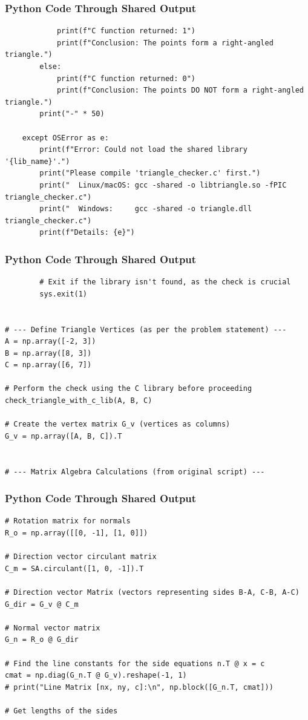 \documentclass{beamer}
\begin{document}
\begin{frame}[fragile]
\frametitle{Python Code Through Shared Output}
\begin{lstlisting}
            print(f"C function returned: 1")
            print(f"Conclusion: The points form a right-angled triangle.")
        else:
            print(f"C function returned: 0")
            print(f"Conclusion: The points DO NOT form a right-angled triangle.")
        print("-" * 50)

    except OSError as e:
        print(f"Error: Could not load the shared library '{lib_name}'.")
        print("Please compile 'triangle_checker.c' first.")
        print("  Linux/macOS: gcc -shared -o libtriangle.so -fPIC triangle_checker.c")
        print("  Windows:     gcc -shared -o triangle.dll triangle_checker.c")
        print(f"Details: {e}")
        \end{lstlisting}
\end{frame}  

\begin{frame}[fragile]
\frametitle{Python Code Through Shared Output}
\begin{lstlisting}
        # Exit if the library isn't found, as the check is crucial
        sys.exit(1)


# --- Define Triangle Vertices (as per the problem statement) ---
A = np.array([-2, 3])
B = np.array([8, 3])
C = np.array([6, 7])

# Perform the check using the C library before proceeding
check_triangle_with_c_lib(A, B, C)

# Create the vertex matrix G_v (vertices as columns)
G_v = np.array([A, B, C]).T


# --- Matrix Algebra Calculations (from original script) ---
\end{lstlisting}
\end{frame}  

\begin{frame}[fragile]
\frametitle{Python Code Through Shared Output}
\begin{lstlisting}
# Rotation matrix for normals
R_o = np.array([[0, -1], [1, 0]])

# Direction vector circulant matrix
C_m = SA.circulant([1, 0, -1]).T

# Direction vector Matrix (vectors representing sides B-A, C-B, A-C)
G_dir = G_v @ C_m

# Normal vector matrix
G_n = R_o @ G_dir

# Find the line constants for the side equations n.T @ x = c
cmat = np.diag(G_n.T @ G_v).reshape(-1, 1)
# print("Line Matrix [nx, ny, c]:\n", np.block([G_n.T, cmat]))

# Get lengths of the sides
\end{lstlisting}
\end{frame}  
\end{document}
